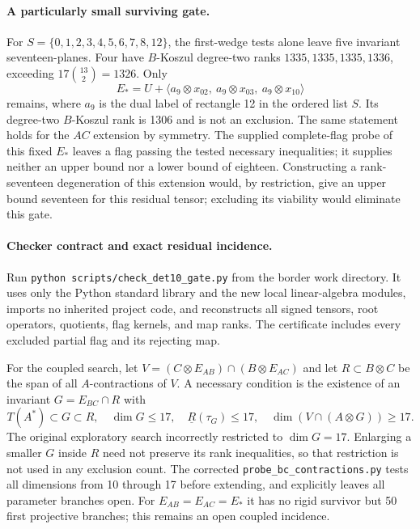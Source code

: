 \paragraph{A particularly small surviving gate.}
For $S=\{0,1,2,3,4,5,6,7,8,12\}$, the first-wedge tests alone leave
five invariant seventeen-planes.  Four have $B$-Koszul degree-two ranks
$1335,1335,1335,1336$, exceeding $17\binom{13}{2}=1326$.
Only
\[
 E_*=U+\langle a_9\otimes x_{02},\ a_9\otimes x_{03},\
                    a_9\otimes x_{10}\rangle
\]
remains, where $a_9$ is the dual label of rectangle 12 in the ordered list
$S$.  Its degree-two $B$-Koszul rank is 1306 and is not an exclusion.
The same statement holds for the $AC$ extension by symmetry.  The supplied
complete-flag probe of this fixed $E_*$ leaves a flag passing the tested
necessary inequalities; it supplies neither an upper bound nor a lower
bound of eighteen.  Constructing a rank-seventeen degeneration of this
extension would, by restriction, give an upper bound seventeen for this
residual tensor; excluding its viability would eliminate this gate.

\paragraph{Checker contract and exact residual incidence.}
Run \texttt{python scripts/check\_det10\_gate.py} from the border work
directory.  It uses only the Python standard library and the new local
linear-algebra modules, imports no inherited project code, and reconstructs
all signed tensors, root operators, quotients, flag kernels, and map ranks.
The certificate includes every excluded partial flag and its rejecting map.

For the coupled search, let
$V=(C\otimes E_{AB})\cap(B\otimes E_{AC})$ and let $R\subset B\otimes C$
be the span of all $A$-contractions of $V$.  A necessary condition is the
existence of an invariant $G=E_{BC}\cap R$ with
\[
 T(A^*)\subset G\subset R,\quad \dim G\le17,\quad
 \underline R(\tau_G)\le17,\quad
 \dim(V\cap(A\otimes G))\ge17.
\]
The original exploratory search incorrectly restricted to $\dim G=17$.
Enlarging a smaller $G$ inside $R$ need not preserve its rank inequalities,
so that restriction is not used in any exclusion count.  The corrected
\texttt{probe\_bc\_contractions.py} tests all dimensions from 10 through
17 before extending, and explicitly leaves all parameter branches open.
For $E_{AB}=E_{AC}=E_*$ it has no rigid survivor but 50 first projective
branches; this remains an open coupled incidence.

